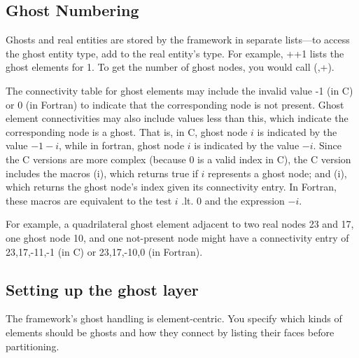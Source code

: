 \subsection{Ghost Numbering}
\label{sec:ghost_num}
Ghosts and real entities are stored by the framework
in separate lists---to access the ghost entity type, add 
to the real entity's type.  For example, ++1 
lists the ghost elements for  1.  To get the number 
of ghost nodes, you would call 
(,+).

The connectivity table for ghost elements may include the invalid 
value -1 (in C) or 0 (in Fortran) to indicate that the corresponding 
node is not present.  Ghost element connectivities may also include values
less than this, which indicate the corresponding node is a ghost.
That is, in C, ghost node $i$ is indicated by the value $-1-i$, while
in fortran, ghost node $i$ is indicated by the value $-i$.  Since the 
C versions are more complex (because 0 is a valid index in C), the
C version includes the macros (i), which
returns true if $i$ represents a ghost node; and (i),
which returns the ghost node's index given its connectivity entry.
In Fortran, these macros are equivalent to the test $i$ .lt. $0$ and 
the expression $-i$.

For example, a quadrilateral ghost element adjacent to two real 
nodes 23 and 17, one ghost node 10, and one not-present node might have a 
connectivity entry of {23,17,-11,-1} (in C) or {23,17,-10,0} (in Fortran).


\subsection{Setting up the ghost layer}
The framework's ghost handling is element-centric. You specify which kinds of elements should be ghosts and how they connect by listing their faces before partitioning.  


